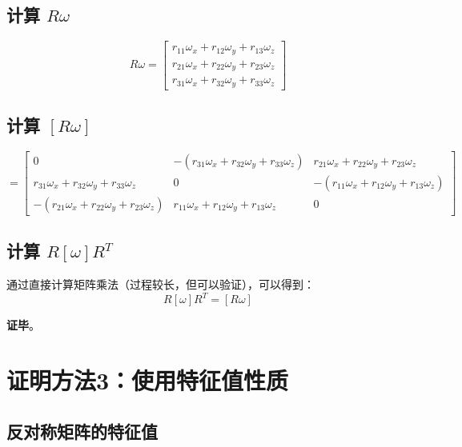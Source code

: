 \documentclass[12pt,a4paper]{article}
\begin{document}
\subsection{计算 $R \omega$}

\begin{equation}
R \omega = \begin{bmatrix}
r_{11} \omega_x + r_{12} \omega_y + r_{13} \omega_z \\
r_{21} \omega_x + r_{22} \omega_y + r_{23} \omega_z \\
r_{31} \omega_x + r_{32} \omega_y + r_{33} \omega_z
\end{bmatrix}
\end{equation}

\subsection{计算 $[R \omega]$}

\begin{equation}
[R \omega] = \begin{bmatrix}
0 & -(r_{31} \omega_x + r_{32} \omega_y + r_{33} \omega_z) & r_{21} \omega_x + r_{22} \omega_y + r_{23} \omega_z \\
r_{31} \omega_x + r_{32} \omega_y + r_{33} \omega_z & 0 & -(r_{11} \omega_x + r_{12} \omega_y + r_{13} \omega_z) \\
-(r_{21} \omega_x + r_{22} \omega_y + r_{23} \omega_z) & r_{11} \omega_x + r_{12} \omega_y + r_{13} \omega_z & 0
\end{bmatrix}
\end{equation}

\subsection{计算 $R [\omega] R^T$}

通过直接计算矩阵乘法（过程较长，但可以验证），可以得到：
\begin{equation}
R [\omega] R^T = [R \omega]
\end{equation}

\textbf{证毕}。

\section{证明方法3：使用特征值性质}

\subsection{反对称矩阵的特征值}
\end{document}
